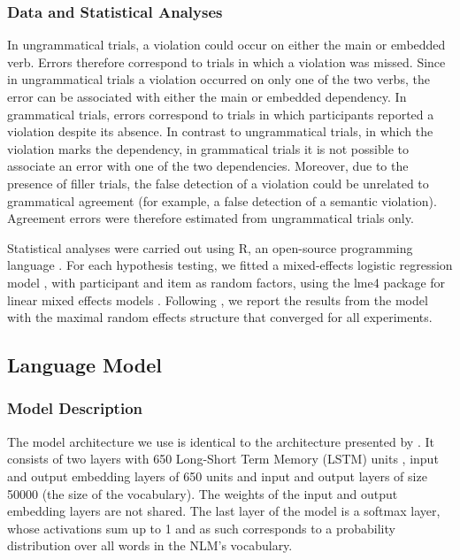 \subsubsection{Data and Statistical Analyses}
In ungrammatical trials, a violation could occur on either the main or embedded verb. Errors therefore correspond to trials in which a violation was missed. Since in ungrammatical trials a violation occurred on only one of the two verbs, the error can be associated with either the main or embedded dependency. In grammatical trials, errors correspond to trials in which participants reported a violation despite its absence. In contrast to ungrammatical trials, in which the violation marks the dependency, in grammatical trials it is not possible to associate an error with one of the two dependencies. Moreover, due to the presence of filler trials, the false detection of a violation could be unrelated to grammatical agreement (for example, a false detection of a semantic violation). Agreement errors were therefore estimated from ungrammatical trials only.

Statistical analyses were carried out using R, an open-source programming language \citep{R}. For each hypothesis testing, we fitted a mixed-effects logistic regression model \citep{Jaeger2008}, with participant and item as random factors, using the lme4 package for linear mixed effects models \citep{Bates}. Following \citet{Baayen:etal:2008}, we report the results from the model with the maximal random effects structure that converged for all experiments. 

\subsection{Language Model}
\subsubsection{Model Description}
The model architecture we use is identical to the architecture presented by \citet{Gulordava:etal:2018}. 
It consists of two layers with 650 Long-Short Term Memory (LSTM) units \citep{Hochreiter:Schmidhuber:1997}, input and output embedding layers of 650 units and input and output layers of size 50000 (the size of the vocabulary). The weights of the input and output embedding layers are not shared.
The last layer of the model is a softmax layer, whose activations sum up to 1 and as such corresponds to a probability distribution over all words in the NLM's vocabulary.

